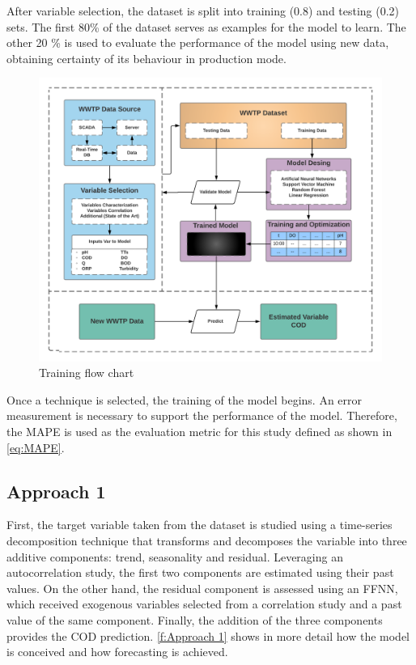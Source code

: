 After variable selection, the dataset is split into training (0.8) and testing (0.2) sets. The first 80\% of the dataset serves as examples for the model to learn. The other 20 \% is used to evaluate the performance of the model using new data, obtaining certainty of its behaviour in production mode. 

\begin{figure}[h]
\centering
\includegraphics[width=\linewidth]{figures/Ch4/training-FlowChart.png}
\caption{Training flow chart}
\label{f:training-flowchart}
\end{figure}

Once a technique is selected, the training of the model begins. An error measurement is necessary to support the performance of the model. Therefore, the \ac{MAPE} is used as the evaluation metric for this study defined as shown in \autoref{eq:MAPE}.

\subsection{Approach 1}
\label{s:Approach1}

First, the target variable taken from the dataset is studied using a time-series decomposition technique that transforms and decomposes the variable into three additive components: trend, seasonality and residual. Leveraging an autocorrelation study, the first two components are estimated using their past values. On the other hand, the residual component is assessed using an \ac{FFNN}, which received exogenous variables selected from a correlation study and a past value of the same component. Finally, the addition of the three components provides the \ac{COD} prediction. \autoref{f:Approach 1} shows in more detail how the model is conceived and how forecasting is achieved.

